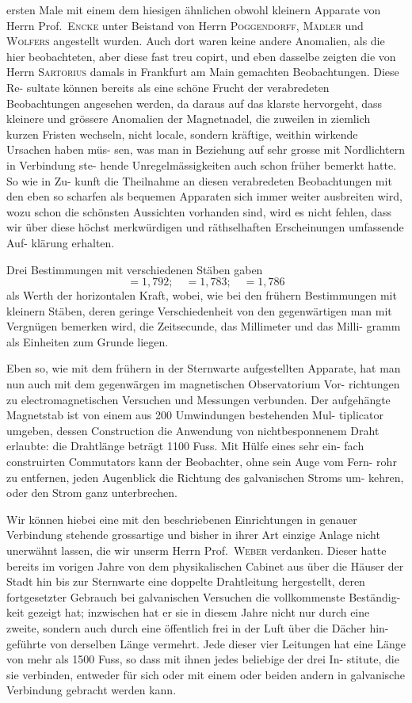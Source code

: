 \documentclass[12pt,a4paper]{article}
\begin{document}
ersten Male mit einem dem hiesigen ähnlichen obwohl kleinern Apparate von 
Herrn Prof.\ \textsc{Encke} unter Beistand von Herrn \textsc{Poggendorff}, \textsc{Mädler} und \textsc{Wolfers} 
angestellt wurden. Auch dort waren keine andere Anomalien, als die hier 
beobachteten, aber diese fast treu copirt, und eben dasselbe zeigten die von Herrn 
\textsc{Sartorius} damals in Frankfurt am Main gemachten Beobachtungen. Diese Re-
sultate können bereits als eine schöne Frucht der verabredeten Beobachtungen 
angesehen werden, da daraus auf das klarste hervorgeht, dass kleinere und 
grössere Anomalien der Magnetnadel, die zuweilen in ziemlich kurzen Fristen 
wechseln, nicht locale, sondern kräftige, weithin wirkende Ursachen haben müs-
sen, was man in Beziehung auf sehr grosse mit Nordlichtern in Verbindung ste-
hende Unregelmässigkeiten auch schon früher bemerkt hatte. So wie in Zu-
kunft die Theilnahme an diesen verabredeten Beobachtungen mit den eben so 
scharfen als bequemen Apparaten sich immer weiter ausbreiten wird, wozu schon 
die schönsten Aussichten vorhanden sind, wird es nicht fehlen, dass wir über 
diese höchst merkwürdigen und räthselhaften Erscheinungen umfassende Auf-
klärung erhalten.

\medskip

Drei Bestimmungen mit verschiedenen Stäben gaben
\[
= 1{,}792;\quad = 1{,}783;\quad = 1{,}786
\]
als Werth der horizontalen Kraft, wobei, wie bei den frühern Bestimmungen 
mit kleinern Stäben, deren geringe Verschiedenheit von den gegenwärtigen man 
mit Vergnügen bemerken wird, die Zeitsecunde, das Millimeter und das Milli-
gramm als Einheiten zum Grunde liegen.

Eben so, wie mit dem frühern in der Sternwarte aufgestellten Apparate, 
hat man nun auch mit dem gegenwärgen im magnetischen Observatorium Vor-
richtungen zu electromagnetischen Versuchen und Messungen verbunden. Der 
aufgehängte Magnetstab ist von einem aus 200 Umwindungen bestehenden Mul-
tiplicator umgeben, dessen Construction die Anwendung von nichtbesponnenem 
Draht erlaubte: die Drahtlänge beträgt 1100 Fuss. Mit Hülfe eines sehr ein-
fach construirten Commutators kann der Beobachter, ohne sein Auge vom Fern-
rohr zu entfernen, jeden Augenblick die Richtung des galvanischen Stroms um-
kehren, oder den Strom ganz unterbrechen.

Wir können hiebei eine mit den beschriebenen Einrichtungen in genauer 
Verbindung stehende grossartige und bisher in ihrer Art einzige Anlage nicht 
unerwähnt lassen, die wir unserm Herrn Prof.\ \textsc{Weber} verdanken. Dieser hatte 
bereits im vorigen Jahre von dem physikalischen Cabinet aus über die Häuser 
der Stadt hin bis zur Sternwarte eine doppelte Drahtleitung hergestellt, deren 
fortgesetzter Gebrauch bei galvanischen Versuchen die vollkommenste Beständig-
keit gezeigt hat; inzwischen hat er sie in diesem Jahre nicht nur durch eine 
zweite, sondern auch durch eine öffentlich frei in der Luft über die Dächer hin-
geführte von derselben Länge vermehrt. Jede dieser vier Leitungen hat eine 
Länge von mehr als 1500 Fuss, so dass mit ihnen jedes beliebige der drei In-
stitute, die sie verbinden, entweder für sich oder mit einem oder beiden andern 
in galvanische Verbindung gebracht werden kann.
\end{document}
